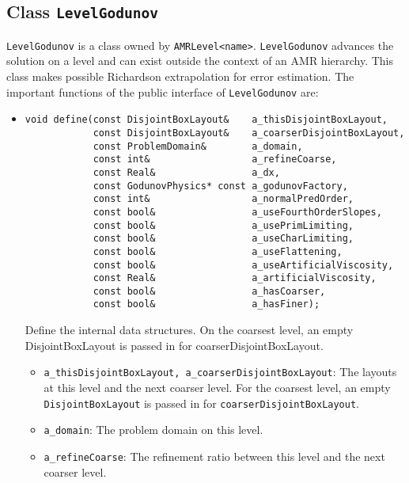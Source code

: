 \subsection{Class {\tt LevelGodunov} }
{\tt LevelGodunov} is a class owned by {\tt AMRLevel<name>}.
{\tt LevelGodunov} advances the solution on a level and can exist outside
the context of an AMR hierarchy.  This class makes possible Richardson
extrapolation for error estimation.  The important functions of the public
interface of {\tt LevelGodunov} are:
\begin{itemize}
\item \begin{small} \begin{verbatim}
void define(const DisjointBoxLayout&    a_thisDisjointBoxLayout,
            const DisjointBoxLayout&    a_coarserDisjointBoxLayout,
            const ProblemDomain&        a_domain,
            const int&                  a_refineCoarse,
            const Real&                 a_dx,
            const GodunovPhysics* const a_godunovFactory,
            const int&                  a_normalPredOrder,
            const bool&                 a_useFourthOrderSlopes,
            const bool&                 a_usePrimLimiting,
            const bool&                 a_useCharLimiting,
            const bool&                 a_useFlattening,
            const bool&                 a_useArtificialViscosity,
            const Real&                 a_artificialViscosity,
            const bool&                 a_hasCoarser,
            const bool&                 a_hasFiner);
\end{verbatim}\end{small}
     Define the internal data structures.  On the coarsest level, an empty
     DisjointBoxLayout is passed in for coarserDisjointBoxLayout.
\begin{itemize}    
\item \verb/a_thisDisjointBoxLayout, a_coarserDisjointBoxLayout/:
     The layouts at this level and the next coarser level.  
     For the coarsest level, an empty {\tt DisjointBoxLayout}
     is passed in for \verb/coarserDisjointBoxLayout/.
\vspace{-0.07in}
\item \verb/a_domain/:  The problem domain on this level.
\vspace{-0.07in}
\item \verb/a_refineCoarse/:  The refinement ratio between
     this level and the next coarser level.
\vspace{-0.07in}

\end{itemize}
\end{itemize}

